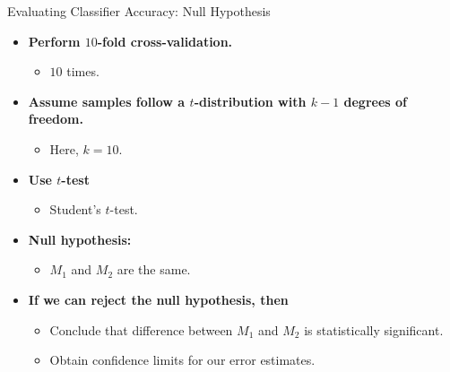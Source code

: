 \begin{frame}{Evaluating Classifier Accuracy: Null Hypothesis}
	\begin{itemize}
		\item \textbf{Perform $10$-fold cross-validation.}
		      \begin{itemize}
			      \item $10$ times.
		      \end{itemize}
		\item \textbf{Assume samples follow a $t$-distribution with $k-1$ degrees of freedom.}
		      \begin{itemize}
			      \item Here, $k = 10$.
		      \end{itemize}
		\item \textbf{Use $t$-test}
		      \begin{itemize}
			      \item Student's $t$-test.
		      \end{itemize}
		\item \textbf{Null hypothesis:}
		      \begin{itemize}
			      \item $M_1$ and $M_2$ are the same.
		      \end{itemize}
		\item \textbf{If we can reject the null hypothesis, then}
		      \begin{itemize}
			      \item Conclude that difference between $M_1$ and $M_2$ is statistically significant.
			      \item Obtain confidence limits for our error estimates.
		      \end{itemize}
	\end{itemize}
\end{frame}

